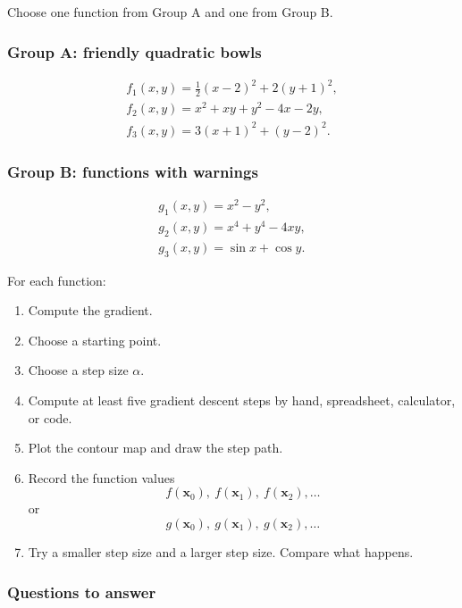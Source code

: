 Choose one function from Group A and one from Group B.

\subsubsection*{Group A: friendly quadratic bowls}

\[
\begin{array}{c}
f_1(x,y)=\frac12(x-2)^2+2(y+1)^2,\\[2mm]
f_2(x,y)=x^2+xy+y^2-4x-2y,\\[1mm]
f_3(x,y)=3(x+1)^2+(y-2)^2.
\end{array}
\]

\subsubsection*{Group B: functions with warnings}

\[
\begin{array}{c}
g_1(x,y)=x^2-y^2,\\[1mm]
g_2(x,y)=x^4+y^4-4xy,\\[1mm]
g_3(x,y)=\sin x+\cos y.
\end{array}
\]

For each function:

\begin{enumerate}
\item Compute the gradient.

\item Choose a starting point.

\item Choose a step size \(\alpha\).

\item Compute at least five gradient descent steps by hand, spreadsheet, calculator, or
code.

\item Plot the contour map and draw the step path.

\item Record the function values
\[
    f(\mathbf x_0),\ f(\mathbf x_1),\ f(\mathbf x_2),\ldots
\]
or
\[
    g(\mathbf x_0),\ g(\mathbf x_1),\ g(\mathbf x_2),\ldots
\]

\item Try a smaller step size and a larger step size.  Compare what happens.
\end{enumerate}

\subsubsection*{Questions to answer}

